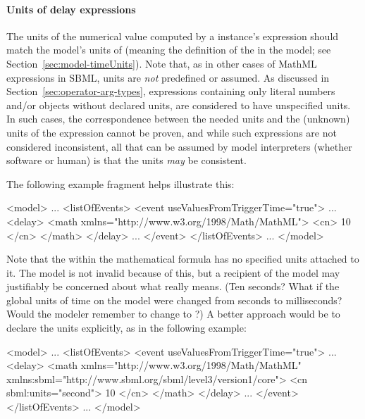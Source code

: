 \paragraph{Units of delay expressions}

The units of the numerical value computed by a \Delay instance's
 expression should match the model's units of
 (meaning the definition of the  in
the model; see Section~\ref{sec:model-timeUnits}).  Note that, as
in other cases of MathML expressions in SBML, units are \emph{not}
predefined or assumed.  As discussed in
Section~\ref{sec:operator-arg-types}, expressions containing only
literal numbers and/or \Parameter objects without declared units,
are considered to have unspecified units.  In such cases, the
correspondence between the needed units and the (unknown) units of
the \Delay {} expression cannot be proven, and while
such expressions are not considered inconsistent, all that can be
assumed by model interpreters (whether software or human) is that
the units \emph{may} be consistent.

The following \Event example fragment helps illustrate this:
\label{sec:event:delay:example}

\begin{example}
<model>
    ...
    <listOfEvents>
        <event useValuesFromTriggerTime="true">
            ...
            <delay>
                <math xmlns="http://www.w3.org/1998/Math/MathML">
                    <cn> 10 </cn>
                </math>
            </delay>
            ...
        </event>
    </listOfEvents>
    ...
</model>
\end{example}

Note that the  within the mathematical formula
has no specified units attached to it.  The model is not invalid
because of this, but a recipient of the model may justifiably be
concerned about what  really means.  (Ten seconds?  What
if the global units of time on the model were changed from seconds
to milliseconds?  Would the modeler remember to change  to
?)  A better approach would be to declare the units
explicitly, as in the following example:

\begin{example}
<model>
    ...
    <listOfEvents>
        <event useValuesFromTriggerTime="true">
            ...
            <delay>
                <math xmlns="http://www.w3.org/1998/Math/MathML"
                      xmlns:sbml="http://www.sbml.org/sbml/level3/version1/core">
                    <cn sbml:units="second"> 10 </cn>
                </math>
            </delay>
            ...
        </event>
    </listOfEvents>
    ...
</model>
\end{example}

